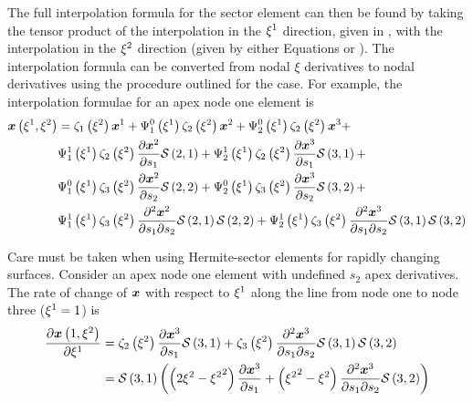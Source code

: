 The full interpolation formula for the sector element can then be found by
taking the tensor product of the interpolation in the $\xi^{1}$ direction,
given in , with the interpolation in the
$\xi^{2}$ direction (given by either Equations  or
). The interpolation formula can be converted from
nodal $\xi$ derivatives to nodal \arclen derivatives using the procedure
outlined for the \bicubicherm case. For example, the interpolation formulae for
an apex node one element is 
\begin{equation}
  \begin{split}
    \fnof{\vect{x}}{\xione,\xitwo} &=
    \hsonebfn{1}{\xitwo}\nodept{\vect{x}}{1}+\chbfn{1}{0}{\xione}\hsonebfn{2}
    {\xitwo}\nodept{\vect{x}}{2}+\chbfn{2}{0}{\xione}\hsonebfn{2}{\xitwo}
    \nodept{\vect{x}}{3} + \\
    & \chbfn{1}{1}{\xione}\hsonebfn{2}{\xitwo}\delby{\nodept{\vect{x}}{2}}{s_{1}}
    \nsftwo{2}{1}+\chbfn{2}{1}{\xione}\hsonebfn{2}{\xitwo}\delby{\nodept{\vect{x}}
      {3}}{s_{1}}\nsftwo{3}{1} + \\
    & \chbfn{1}{0}{\xione}\hsonebfn{3}{\xitwo}\delby{\nodept{\vect{x}}{2}}{s_{2}}
    \nsftwo{2}{2} + \chbfn{2}{0}{\xione}\hsonebfn{3}{\xitwo}
    \delby{\nodept{\vect{x}}{3}}{s_{2}}\nsftwo{3}{2} + \\
    & \chbfn{1}{1}{\xione}\hsonebfn{3}{\xitwo}\deltwoby{\nodept{\vect{x}}{2}}
    {s_{1}}{s_{2}}\nsftwo{2}{1}\nsftwo{2}{2} + 
    \chbfn{2}{1}{\xione}\hsonebfn{3}{\xitwo}\deltwoby{\nodept{\vect{x}}{3}}
    {s_{1}}{s_{2}}\nsftwo{3}{1}\nsftwo{3}{2}    
  \end{split}
  \label{eqn:hsapex1sinterp}
\end{equation}

Care must be taken when using Hermite-sector elements for rapidly changing
surfaces. Consider an apex node one element with undefined $s_{2}$ apex
derivatives. The rate of change of $\vect{x}$ with respect to
$\xi^{1}$ along the line from node one to node three (\ie $\xi^{1}=1$) is
\begin{equation}
  \begin{split}
    \delby{\fnof{\vect{x}}{1,\xitwo}}{\xione} &= \hsonebfn{2}{\xitwo}\delby{
      \nodept{\vect{x}}{3}}{s_{1}}\nsftwo{3}{1}+\hsonebfn{3}{\xitwo}\deltwoby{
      \nodept{\vect{x}}{3}}{s_{1}}{s_{2}}\nsftwo{3}{1}\nsftwo{3}{2} \\
    &= \nsftwo{3}{1}\pbrac{\pbrac{2\xitwo-\xitwosq}\delby{\nodept{\vect{x}}{3}}
      {s_{1}}+\pbrac{\xitwosq-\xitwo}\deltwoby{\nodept{\vect{x}}{3}}{s_{1}}{s_{2}}
      \nsftwo{3}{2}}
  \end{split}
\end{equation}

